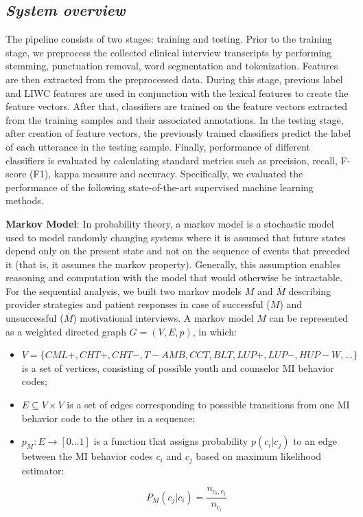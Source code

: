 \documentclass{amia}
\begin{document}
\subsection*{\textit{System overview}}
The pipeline consists of two stages: training and testing. Prior to the training stage, we preprocess the collected clinical interview transcripts by performing stemming, punctuation removal, word segmentation and tokenization. Features are then extracted from the preprocessed data. During this stage, previous label and LIWC features are used in conjunction with the lexical features to create the feature vectors. After that, classifiers are trained on the feature vectors extracted from the training samples and their associated annotations. In the testing stage, after creation of feature vectors, the previously trained classifiers predict the label of each utterance in the testing sample. Finally, performance of different classifiers is evaluated by calculating standard metrics such as precision, recall, F-score (F1), kappa measure and accuracy. Specifically, we evaluated the performance of the following state-of-the-art supervised machine learning methods.

\textbf {Markov Model}: In probability theory, a markov model \citep{45} is a stochastic model used to model randomly changing systems where it is assumed that future states depend only on the present state and not on the sequence of events that preceded it (that is, it assumes the markov property). Generally, this assumption enables reasoning and computation with the model that would otherwise be intractable. For the sequential analysis, we built two markov models $M$ and $\overline{M}$ describing provider strategies and patient responses in case of successful ($M$) and unsuccessful ($\overline{M}$) motivational interviews. A markov model $M$ can be represented as a weighted directed graph $G = (V, E, p)$, in which:

\begin{itemize}
\item $V = \{CML+, CHT+, CHT-, T-AMB, CCT, BLT, LUP+, LUP-, HUP-W, ...\}$ is a set of vertices, consisting of possible youth and counselor MI behavior codes;
\item $E \subseteq V \times V$ is a set of edges corresponding to posssible transitions from one MI behavior code to the other in a sequence;
\item $p_M:E\rightarrow[0...1]$ is a function that assigns probability $p(c_i|c_j)$ to an edge between the MI behavior codes $c_i$ and $c_j$ based on maximum likelihood estimator:

\begin{equation}
P_M(c_j|c_i) = \frac{n_{c_i,c_j}}{n_{c_i}}
\end{equation}

\end{itemize}
\end{document}
